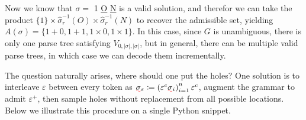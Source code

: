 \documentclass[sigplan,review,anonymous,acmsmall]{acmart}\settopmatter{printfolios=false,printccs=false,printacmref=false}
\begin{document}
  Now we know that $\sigma =$ 1 \underline{O} \underline{N} is a valid solution, and therefor we can take the product $\{1\}\times \hat\sigma_r^{-1}(O) \times \hat\sigma_r^{-1}(N)$ to recover the admissible set, yielding $A(\sigma)=\{1+0, 1+1, 1\times 0, 1\times 1\}$. In this case, since $G$ is unambiguous, there is only one parse tree satisfying $V_{0, |\sigma|, |\sigma|}$, but in general, there can be multiple valid parse trees, in which case we can decode them incrementally.

  The question naturally arises, where should one put the holes? One solution is to interleave $\varepsilon$ between every token as $\err{\sigma}_\varepsilon\coloneqq \left(\varepsilon^c\err{\sigma}_i\right)_{i=1}^n\varepsilon^c$, augment the grammar to admit $\varepsilon^+$, then sample holes without replacement from all possible locations. Below we illustrate this procedure on a single Python snippet.

%
%
%
\end{document}
